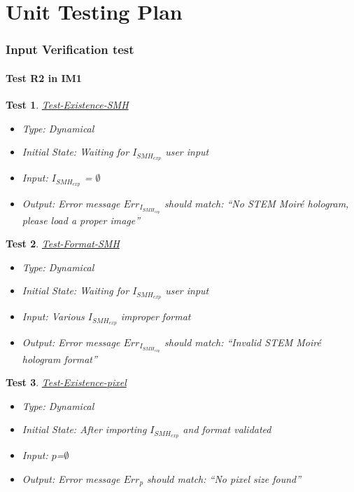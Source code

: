 \documentclass[12pt, titlepage]{article}
\newtheorem{Test}{Test}
\begin{document}


				
\section{Unit Testing Plan}
		

\subsubsection{Input Verification test}

\paragraph{Test R2 in IM1}

\begin{Test}\normalfont\underline{Test-Existence-SMH}
\begin{itemize}
\item Type: Dynamical
\item Initial State: Waiting for $I_{SMH_{exp}}$ user input
\item Input: $I_{SMH_{exp}}$ = $\emptyset$
\item Output: Error message $Err_{I_{SMH_{exp}}}$ should match: \enquote{No STEM Moir{\'e} hologram, please load a proper image}
\end{itemize}
\end{Test}

\begin{Test}\normalfont\underline{Test-Format-SMH}
\begin{itemize}
\item Type: Dynamical
\item Initial State: Waiting for $I_{SMH_{exp}}$ user input
\item Input: Various $I_{SMH_{exp}}$ improper format
\item Output: Error message $Err_{I_{SMH_{exp}}}$ should match: \enquote{Invalid STEM Moir{\'e} hologram format}
\end{itemize}
\end{Test}

\begin{Test}\normalfont\underline{Test-Existence-pixel}
\begin{itemize}
\item Type: Dynamical
\item Initial State: After importing $I_{SMH_{exp}}$ and format validated
\item Input: $p$=$\emptyset$
\item Output: Error message $Err_{p}$ should match: \enquote{No pixel size found}
\end{itemize}
\end{Test}
\end{document}
